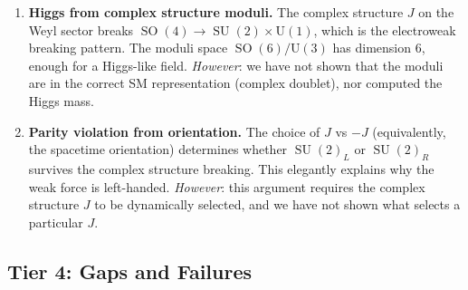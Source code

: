 \documentclass[12pt,a4paper]{article}
\DeclareMathOperator{\SO}{SO}
\DeclareMathOperator{\SU}{SU}
\begin{document}
\begin{conjecturebox}
\begin{enumerate}
\item \textbf{Higgs from complex structure moduli.} The complex structure $J$ on the Weyl sector breaks $\SO(4) \to \SU(2) \times \mathrm{U}(1)$, which is the electroweak breaking pattern. The moduli space $\SO(6)/\mathrm{U}(3)$ has dimension 6, enough for a Higgs-like field. \textit{However}: we have not shown that the moduli are in the correct SM representation (complex doublet), nor computed the Higgs mass.

\item \textbf{Parity violation from orientation.} The choice of $J$ vs $-J$ (equivalently, the spacetime orientation) determines whether $\SU(2)_L$ or $\SU(2)_R$ survives the complex structure breaking. This elegantly explains why the weak force is left-handed. \textit{However}: this argument requires the complex structure $J$ to be dynamically selected, and we have not shown what selects a particular $J$.
\end{enumerate}
\end{conjecturebox}

\subsection{Tier 4: Gaps and Failures}
\end{document}
